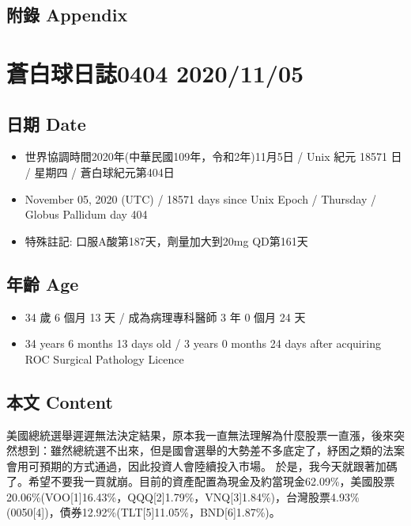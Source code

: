 \documentclass[
]{article}
\providecommand{\tightlist}{%
  \setlength{\itemsep}{0pt}\setlength{\parskip}{0pt}}
\begin{document}
\hypertarget{ux9644ux9304-appendix-3}{%
\subsection{附錄 Appendix}\label{ux9644ux9304-appendix-3}}

\hypertarget{ux84bcux767dux7403ux65e5ux8a8c0404-20201105}{%
\section{蒼白球日誌0404
2020/11/05}\label{ux84bcux767dux7403ux65e5ux8a8c0404-20201105}}

\hypertarget{ux65e5ux671f-date-4}{%
\subsection{日期 Date}\label{ux65e5ux671f-date-4}}

\begin{itemize}
\tightlist
\item
  世界協調時間2020年(中華民國109年，令和2年)11月5日 / Unix 紀元 18571 日
  / 星期四 / 蒼白球紀元第404日
\item
  November 05, 2020 (UTC) / 18571 days since Unix Epoch / Thursday /
  Globus Pallidum day 404
\item
  特殊註記: 口服A酸第187天，劑量加大到20mg QD第161天
\end{itemize}

\hypertarget{ux5e74ux9f61-age-4}{%
\subsection{年齡 Age}\label{ux5e74ux9f61-age-4}}

\begin{itemize}
\tightlist
\item
  34 歲 6 個月 13 天 / 成為病理專科醫師 3 年 0 個月 24 天
\item
  34 years 6 months 13 days old / 3 years 0 months 24 days after
  acquiring ROC Surgical Pathology Licence
\end{itemize}

\hypertarget{ux672cux6587-content-4}{%
\subsection{本文 Content}\label{ux672cux6587-content-4}}

美國總統選舉遲遲無法決定結果，原本我一直無法理解為什麼股票一直漲，後來突然想到：雖然總統選不出來，但是國會選舉的大勢差不多底定了，紓困之類的法案會用可預期的方式通過，因此投資人會陸續投入市場。
於是，我今天就跟著加碼了。希望不要我一買就崩。目前的資產配置為現金及約當現金62.09\%，美國股票20.06\%(VOO{[}1{]}16.43\%，QQQ{[}2{]}1.79\%，VNQ{[}3{]}1.84\%)，台灣股票4.93\%(0050{[}4{]})，債券12.92\%(TLT{[}5{]}11.05\%，BND{[}6{]}1.87\%)。
\end{document}
